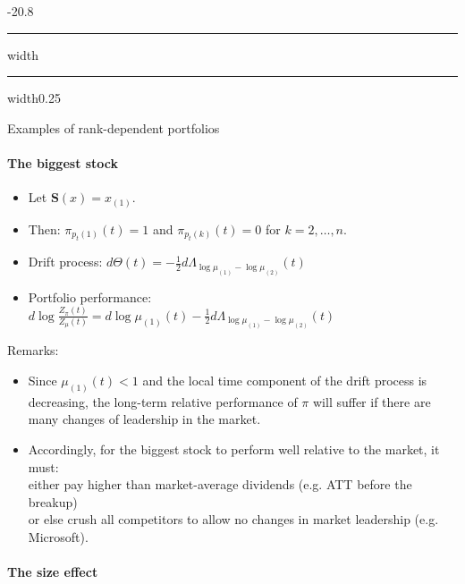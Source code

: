 \documentclass[a4paper,landscape,8pt,fleqn]{scrartcl}
\makeatletter
\renewcommand{\subsection}{\@startsection{subsection}{1}{0mm}%
{-2\baselineskip}{0.8\baselineskip}%
{\hrule depth 0.2pt width\columnwidth\hrule depth0.75pt
width0.25\columnwidth\vspace*{1.2em}\large\bfseries}}
\makeatother
\begin{document}
\begin{multicols*}{3}
\subsection{Examples of rank-dependent portfolios}

\paragraph{The biggest stock}

\begin{itemize}
\item Let $\pmb{S}(x) = x_{(1)}$.
\item Then: $\pi_{p_t(1)}(t) = 1$ and $\pi_{p_t(k)}(t) = 0$ for $k = 2,\ldots, n$.
\item Drift process: $d\Theta(t) = -\frac{1}{2} d\Lambda_{\log \mu_{(1)} - \log \mu_{(2)}}(t)$
\item Portfolio performance: \\
$d \log \frac{Z_\pi(t)}{Z_\mu(t)} = d \log \mu_{(1)}(t) - \frac{1}{2} d\Lambda_{\log \mu_{(1)} - \log \mu_{(2)}}(t)$
\end{itemize}

Remarks:
\begin{itemize}
\item Since $\mu_{(1)}(t) < 1$ and the local time component of the drift process is decreasing, the long-term relative performance of $\pi$ will suffer if there are many changes of leadership in the market.
\item Accordingly, for the biggest stock to perform well relative to the market, it must: \\
either pay higher than market-average dividends (e.g. ATT before the breakup) \\
or else crush all competitors to allow no changes in market leadership (e.g. Microsoft).
\end{itemize}

\paragraph{The size effect}


\end{multicols*}
\end{document}
